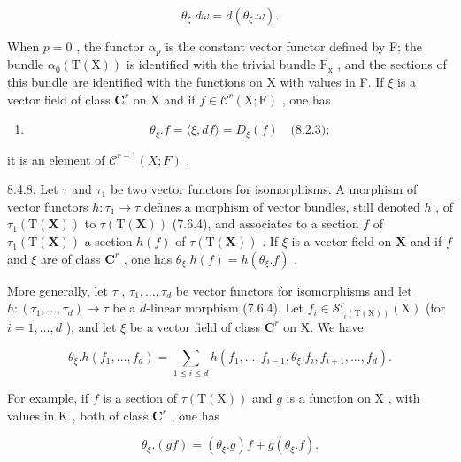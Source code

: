 \[
\theta_ {\xi}. d \omega = d (\theta_ {\xi}. \omega).\tag{4}
\]

When \(p=0\) , the functor \(\alpha_{p}\) is the constant vector functor defined by F; the bundle \(\alpha_{0}(\mathrm{T}(\mathrm{X}))\) is identified with the trivial bundle \(\mathrm{F}_{\mathrm{x}}\) , and the sections of this bundle are identified with the functions on X with values in F. If \(\xi\) is a vector field of class \(\mathbf{C}^{r}\) on X and if \(f\in\mathcal{C}^{r}(\mathrm{X};\mathrm{F})\) , one has

\begin{enumerate}
\def\labelenumi{(\arabic{enumi})}
\setcounter{enumi}{4}
\tightlist
\item
  \[
  \theta_ {\xi}. f = \langle \xi , d f \rangle = D _ {\xi} (f) \quad \text{(8.2.3)};
  \]
\end{enumerate}

it is an element of \(\mathcal{C}^{r-1}(X;F)\) .

8.4.8. Let \(\tau\) and \(\tau_{1}\) be two vector functors for isomorphisms. A morphism of vector functors \(h\colon \tau_{1}\to \tau\) defines a morphism of vector bundles, still denoted \(h\) , of \(\tau_{1}(\mathrm{T}(\mathbf{X}))\) to \(\tau (\mathrm{T}(\mathbf{X}))\) (7.6.4), and associates to a section \(f\) of \(\tau_{1}(\mathrm{T}(\mathbf{X}))\) a section \(h(f)\) of \(\tau (\mathrm{T}(\mathbf{X}))\) . If \(\xi\) is a vector field on \(\mathbf{X}\) and if \(f\) and \(\xi\) are of class \(\mathbf{C}^r\) , one has \(\theta_{\xi}.h(f) = h(\theta_{\xi}.f)\) .

More generally, let \(\tau\) , \(\tau_{1},\ldots,\tau_{d}\) be vector functors for isomorphisms and let \(h\colon(\tau_{1},\ldots,\tau_{d})\to\tau\) be a \(d\)-linear morphism (7.6.4). Let \(f_{i}\in\mathcal{S}_{\tau_{i}(\mathrm{T}(\mathrm{X}))}^{r}(\mathrm{X})\) (for \(i=1,\ldots,d\) ), and let \(\xi\) be a vector field of class \(\mathbf{C}^{r}\) on X. We have

\[
\theta_ {\xi}. h (f _ {1}, \dots , f _ {d}) = \sum_ {1 \leqslant i \leqslant d} h (f _ {1}, \dots , f _ {i - 1}, \theta_ {\xi}. f _ {i}, f _ {i + 1}, \dots , f _ {d}).\tag{6}
\]

For example, if \(f\) is a section of \(\tau(\mathrm{T}(\mathrm{X}))\) and \(g\) is a function on \(\mathrm{X}\) , with values in \(\mathrm{K}\) , both of class \(\mathbf{C}^r\) , one has

\[
\theta_ {\xi}. (g f) = (\theta_ {\xi}. g) f + g (\theta_ {\xi}. f).\tag{7}
\]

